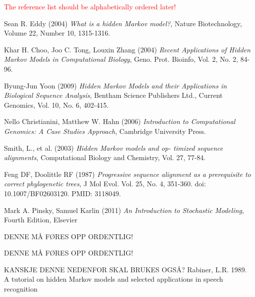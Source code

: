 \documentclass{article}
\begin{document}
\textcolor{red}{The reference list should be alphabetically ordered later!}
\begin{thebibliography}{20}
Sean R. Eddy (2004) \emph{What is a hidden Markov model?}, Nature Biotechnology, Volume 22, Number 10, 1315-1316.

Khar H. Choo, Joo C. Tong, Louxin Zhang (2004) \emph{Recent Applications of Hidden Markov Models in Computational Biology}, Geno. Prot. Bioinfo, Vol. 2, No. 2, 84-96.

Byung-Jun Yoon (2009) \emph{Hidden Markov Models and their Applications in Biological Sequence Analysis}, Bentham Science Publishers Ltd., Current Genomics, Vol. 10, No. 6, 402-415.

Nello Christianini, Matthew W. Hahn (2006) \emph{Introduction to Computational Genomics: A Case Studies Approach}, Cambridge University Press.

Smith, L., et al. (2003) \emph{Hidden Markov models and op-
timized sequence alignments}, Computational Biology and Chemistry, Vol. 27, 77-84.

Feng DF, Doolittle RF (1987) \emph{Progressive sequence alignment as a prerequisite to correct phylogenetic trees}, J Mol Evol. Vol. 25, No. 4, 351-360. doi: 10.1007/BF02603120. PMID: 3118049.

Mark A. Pinsky, Samuel Karlin (2011) \emph{An Introduction to Stochastic Modeling}, Fourth Edition, Elsevier

DENNE MÅ FØRES OPP ORDENTLIG!

DENNE MÅ FØRES OPP ORDENTLIG!

KANSKJE DENNE NEDENFOR SKAL BRUKES OGSÅ?
Rabiner, L.R. 1989. A tutorial on hidden Markov
models and selected applications in speech recognition

\end{thebibliography}
\end{document}
